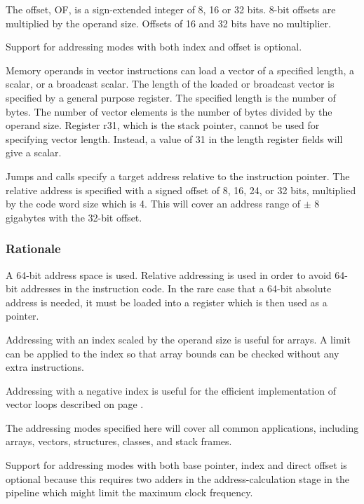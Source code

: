 \documentclass[forwardcom.tex]{subfiles}
\begin{document}
The offset, OF, is a sign-extended integer of 8, 16 or 32 bits. 8-bit offsets are multiplied by the operand size. Offsets of 16 and 32 bits have no multiplier.
\vspace{2mm}

Support for addressing modes with both index and offset is optional.
\vspace{2mm}

Memory operands in vector instructions can load a vector of a specified length, a scalar, or a broadcast scalar. The length of the loaded or broadcast vector is specified by a general purpose register. The specified length is the number of bytes. The number of vector elements is the number of bytes divided by the operand size. Register r31, which is the stack pointer, cannot be used for specifying vector length. Instead, a value of 31 in the length register fields will give a scalar.
\vspace{2mm}

Jumps and calls specify a target address relative to the instruction pointer. The relative address is specified with a signed offset of 8, 16, 24, or 32 bits, multiplied by the code word size which is 4. This will cover an address range of
$\pm$ 8 gigabytes with the 32-bit offset.
\vspace{2mm}

\subsubsection{Rationale}
A 64-bit address space is used. Relative addressing is used in order to avoid 64-bit addresses in the instruction code. In the rare case that a 64-bit absolute address is needed, it must be loaded into a register which is then used as a pointer.
\vspace{2mm}

Addressing with an index scaled by the operand size is useful for arrays. A limit can be applied to the index so that array bounds can be checked without any extra instructions.
\vspace{2mm}

Addressing with a negative index is useful for the efficient implementation of vector loops described on page \pageref{vectorLoops}.
\vspace{2mm}

The addressing modes specified here will cover all common applications, including arrays, vectors, structures, classes, and stack frames.
\vspace{2mm}

Support for addressing modes with both base pointer, index and direct offset is optional because this requires two adders in the address-calculation stage in the pipeline which might limit the maximum clock frequency.
\end{document}
